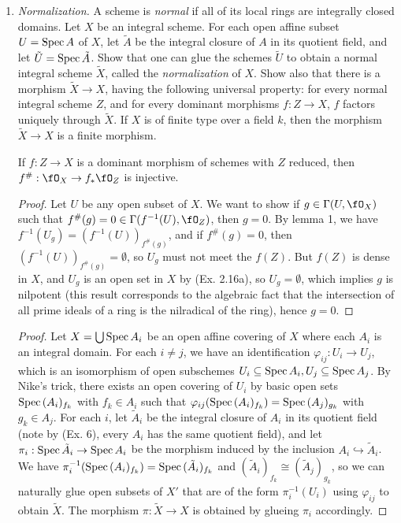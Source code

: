 \documentclass[a4paper]{article}
\begin{document}
\begin{enumerate} [label=\textbf{\arabic*.}, leftmargin=0em]
    \item[\textbf{8.}] \textit{Normalization.} A scheme is \textit{normal} if all of its local rings are integrally closed domains. Let $X$ be an integral scheme. For each open affine subset $U = \operatorname{Spec}{A}$ of $X$, let $\tilde{A}$ be the integral closure of $A$ in its quotient field, and let $\tilde{U} = \operatorname{Spec}{\tilde{A}}$. Show that one can glue the schemes $\tilde{U}$ to obtain a normal integral scheme $\tilde{X}$, called the \textit{normalization} of $X$. Show also that there is a morphism $\tilde{X} \to X$, having the following universal property: for every normal integral scheme $Z$, and for every dominant morphisms $f : Z \to X$, $f$ factors uniquely through $\tilde{X}$. If $X$ is of finite type over a field $k$, then the morphism $\tilde{X} \to X$ is a finite morphism.

          \begin{lemma}
              If $f : Z \to X$ is a dominant morphism of schemes with $Z$ reduced, then $f^\# : \fO_X \to f_* \fO_Z$ is injective.
          \end{lemma}

          \begin{proof}
              Let $U$ be any open subset of $X$. We want to show if $g \in \Gamma(U, \fO_X)$ such that $f^\#(g) = 0 \in \Gamma(f^{-1}(U), \fO_Z)$, then $g = 0$. By lemma 1, we have $f^{-1}(U_g) = (f^{-1}(U))_{f^\#(g)}$, and if $f^\#(g) = 0$, then $(f^{-1}(U))_{f^\#(g)} = \emptyset$, so $U_g$ must not meet the $f(Z)$. But $f(Z)$ is dense in $X$, and $U_g$ is an open set in $X$ by (Ex. 2.16a), so $U_g = \emptyset$, which implies $g$ is nilpotent (this result corresponds to the algebraic fact that the intersection of all prime ideals of a ring is the nilradical of the ring), hence $g = 0$.
          \end{proof}

          \begin{proof}
              Let $X = \bigcup \operatorname{Spec}{A_i}$ be an open affine covering of $X$ where each $A_i$ is an integral domain. For each $i \neq j$, we have an identification $\varphi_{ij} : U_i \to U_j$, which is an isomorphism of open subschemes $U_i \subseteq\operatorname{Spec}{A_i}, U_j \subseteq \operatorname{Spec}{A_j}$. By Nike's trick, there exists an open covering of $U_i$ by basic open sets $\operatorname{Spec}{(A_i)_{f_k}}$ with $f_k \in A_i$ such that $\varphi_{ij}(\operatorname{Spec}{(A_i)_{f_k}}) = \operatorname{Spec}{(A_j)_{g_k}}$ with $g_k \in A_j$. For each $i$, let $\tilde{A}_i$ be the integral closure of $A_i$ in its quotient field (note by (Ex. 6), every $A_i$ has the same quotient field), and let $\pi_i : \operatorname{Spec}{\tilde{A}_i} \to \operatorname{Spec}{A_i}$ be the morphism induced by the inclusion $A_i \hookrightarrow \tilde{A}_i$. We have $\pi_i^{-1}(\operatorname{Spec}{(A_i)_{f_k}}) = \operatorname{Spec}{(\tilde{A}_i)_{f_k}}$ and $(\tilde{A}_i)_{f_k} \cong (\tilde{A}_j)_{g_k}$, so we can naturally glue open subsets of $X'$ that are of the form $\pi_i^{-1}(U_i)$ using $\varphi_{ij}$ to obtain $\tilde{X}$. The morphism $\pi : \tilde{X} \to X$ is obtained by glueing $\pi_i$ accordingly.


\end{proof}
\end{enumerate}
\end{document}
